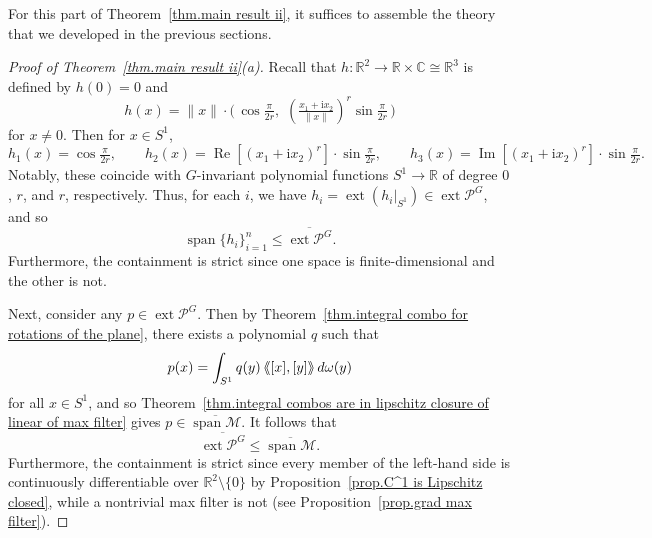 \documentclass{article}
\theoremstyle{plain}
\theoremstyle{definition}
\newcommand{\llangle}{\langle\hspace{-2.5pt}\langle}
\newcommand{\rrangle}{\rangle\hspace{-2.5pt}\rangle}
\begin{document}
For this part of Theorem~\ref{thm.main result ii}, it suffices to assemble the theory that we developed in the previous sections.

\begin{proof}[Proof of Theorem~\ref{thm.main result ii}(a)]
Recall that $h\colon\mathbb{R}^2\to\mathbb{R}\times\mathbb{C}\cong\mathbb{R}^3$ is defined by $h(0)=0$ and 
\[
h(x)
=\|x\|\cdot\big(\,
\cos\tfrac{\pi}{2r},\,\,
(\tfrac{x_1+\mathrm{i}x_2}{\|x\|})^r \sin\tfrac{\pi}{2r}\,\big)
\]
for $x\neq0$.
Then for $x \in S^{1}$,
\[
h_1(x)
=\cos\tfrac{\pi}{2r},
\qquad
h_2(x)
=\operatorname{Re}[(x_1+\mathrm{i}x_2)^r ]\cdot\sin\tfrac{\pi}{2r},
\qquad
h_3(x)
=\operatorname{Im}[(x_1+\mathrm{i}x_2)^r ]\cdot\sin\tfrac{\pi}{2r}.
\]
Notably, these coincide with $G$-invariant polynomial functions $S^{1}\to\mathbb{R}$ of degree $0$, $r$, and $r$, respectively.
Thus, for each $i$, we have $h_i=\operatorname{ext}(h_i|_{S^{1}})\in\operatorname{ext}\mathcal{P}^G$, and so
\[
\operatorname{span}\{h_i\}_{i=1}^n
\leq \overline{\operatorname{ext}\mathcal{P}^G}.
\]
Furthermore, the containment is strict since one space is finite-dimensional and the other is not.

Next, consider any $p\in\operatorname{ext}\mathcal{P}^G$.
Then by Theorem~\ref{thm.integral combo for rotations of the plane}, there exists a polynomial $q$ such that 
\[
p(x)
=\int_{S^1} q(y) \, \llangle [x],[y] \rrangle \, d\omega(y)
\]
for all $x\in S^1$, and so Theorem~\ref{thm.integral combos are in lipschitz closure of linear of max filter} gives $p\in\overline{\operatorname{span}\mathcal{M}}$.
It follows that
\[
\overline{\operatorname{ext}\mathcal{P}^G}
\leq\overline{\operatorname{span}\mathcal{M}}.
\]
Furthermore, the containment is strict since every member of the left-hand side is continuously differentiable over $\mathbb{R}^2\setminus\{0\}$ by Proposition~\ref{prop.C^1 is Lipschitz closed}, while a nontrivial max filter is not (see Proposition~\ref{prop.grad max filter}).


\end{proof}
\end{document}

